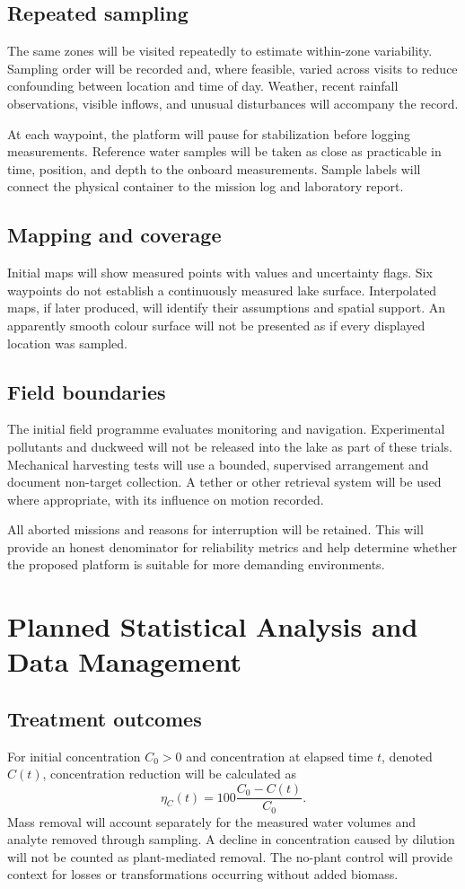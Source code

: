 \documentclass[12pt,a4paper]{article}
\newcommand{\papersection}[1]{\clearpage\section{#1}}
\begin{document}
\subsection{Repeated sampling}
The same zones will be visited repeatedly to estimate within-zone variability. Sampling order will be recorded and, where feasible, varied across visits to reduce confounding between location and time of day. Weather, recent rainfall observations, visible inflows, and unusual disturbances will accompany the record.

At each waypoint, the platform will pause for stabilization before logging measurements. Reference water samples will be taken as close as practicable in time, position, and depth to the onboard measurements. Sample labels will connect the physical container to the mission log and laboratory report.

\subsection{Mapping and coverage}
Initial maps will show measured points with values and uncertainty flags. Six waypoints do not establish a continuously measured lake surface. Interpolated maps, if later produced, will identify their assumptions and spatial support. An apparently smooth colour surface will not be presented as if every displayed location was sampled.

\subsection{Field boundaries}
The initial field programme evaluates monitoring and navigation. Experimental pollutants and duckweed will not be released into the lake as part of these trials. Mechanical harvesting tests will use a bounded, supervised arrangement and document non-target collection. A tether or other retrieval system will be used where appropriate, with its influence on motion recorded.

All aborted missions and reasons for interruption will be retained. This will provide an honest denominator for reliability metrics and help determine whether the proposed platform is suitable for more demanding environments.

\papersection{Planned Statistical Analysis and Data Management}
\subsection{Treatment outcomes}
For initial concentration $C_0>0$ and concentration at elapsed time $t$, denoted $C(t)$, concentration reduction will be calculated as
\[
\eta_C(t)=100\frac{C_0-C(t)}{C_0}.
\]
Mass removal will account separately for the measured water volumes and analyte removed through sampling. A decline in concentration caused by dilution will not be counted as plant-mediated removal. The no-plant control will provide context for losses or transformations occurring without added biomass.
\end{document}
